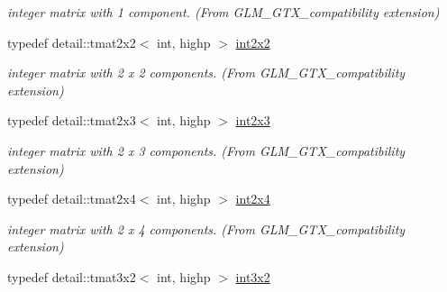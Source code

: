 \begin{CompactItemize}
\begin{CompactList}\small\item\em integer matrix with 1 component. (From GLM\_\-GTX\_\-compatibility extension) \item\end{CompactList}\item 
\hypertarget{group__gtx__compatibility_g7762d2b809aab75003e7e7873ca74a2f}{
typedef detail::tmat2x2$<$ int, highp $>$ \hyperlink{group__gtx__compatibility_g7762d2b809aab75003e7e7873ca74a2f}{int2x2}}
\label{group__gtx__compatibility_g7762d2b809aab75003e7e7873ca74a2f}

\begin{CompactList}\small\item\em integer matrix with 2 x 2 components. (From GLM\_\-GTX\_\-compatibility extension) \item\end{CompactList}\item 
\hypertarget{group__gtx__compatibility_g42c3d6e4924de559104b9ca2b127c9ac}{
typedef detail::tmat2x3$<$ int, highp $>$ \hyperlink{group__gtx__compatibility_g42c3d6e4924de559104b9ca2b127c9ac}{int2x3}}
\label{group__gtx__compatibility_g42c3d6e4924de559104b9ca2b127c9ac}

\begin{CompactList}\small\item\em integer matrix with 2 x 3 components. (From GLM\_\-GTX\_\-compatibility extension) \item\end{CompactList}\item 
\hypertarget{group__gtx__compatibility_g145a388c0d988490d6ce901a664faf50}{
typedef detail::tmat2x4$<$ int, highp $>$ \hyperlink{group__gtx__compatibility_g145a388c0d988490d6ce901a664faf50}{int2x4}}
\label{group__gtx__compatibility_g145a388c0d988490d6ce901a664faf50}

\begin{CompactList}\small\item\em integer matrix with 2 x 4 components. (From GLM\_\-GTX\_\-compatibility extension) \item\end{CompactList}\item 
\hypertarget{group__gtx__compatibility_g2b1f3046fb4692c0c2f76b3933389868}{
typedef detail::tmat3x2$<$ int, highp $>$ \hyperlink{group__gtx__compatibility_g2b1f3046fb4692c0c2f76b3933389868}{int3x2}}
\label{group__gtx__compatibility_g2b1f3046fb4692c0c2f76b3933389868}


\end{CompactItemize}
